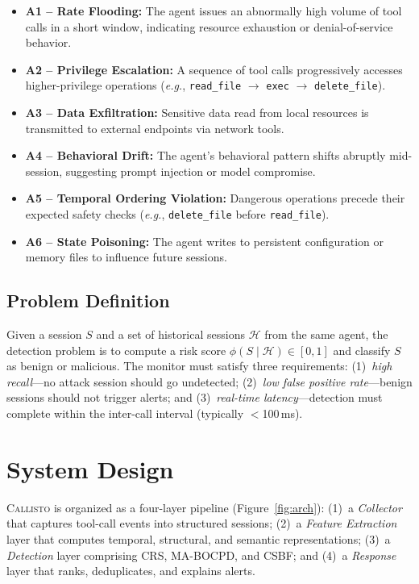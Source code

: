 \documentclass[conference,compsoc]{IEEEtran}
\newcommand{\system}{\textsc{Callisto}}
\newcommand{\eg}{\textit{e.g.}}
\begin{document}
\begin{itemize}[leftmargin=*,nosep]
\item \textbf{A1 -- Rate Flooding:} The agent issues an abnormally high volume of tool calls in a short window, indicating resource exhaustion or denial-of-service behavior.
\item \textbf{A2 -- Privilege Escalation:} A sequence of tool calls progressively accesses higher-privilege operations (\eg, \texttt{read\_file} $\to$ \texttt{exec} $\to$ \texttt{delete\_file}).
\item \textbf{A3 -- Data Exfiltration:} Sensitive data read from local resources is transmitted to external endpoints via network tools.
\item \textbf{A4 -- Behavioral Drift:} The agent's behavioral pattern shifts abruptly mid-session, suggesting prompt injection or model compromise.
\item \textbf{A5 -- Temporal Ordering Violation:} Dangerous operations precede their expected safety checks (\eg, \texttt{delete\_file} before \texttt{read\_file}).
\item \textbf{A6 -- State Poisoning:} The agent writes to persistent configuration or memory files to influence future sessions.
\end{itemize}

\subsection{Problem Definition}

Given a session $S$ and a set of historical sessions $\mathcal{H}$ from the same agent, the detection problem is to compute a risk score $\phi(S \mid \mathcal{H}) \in [0, 1]$ and classify $S$ as benign or malicious. The monitor must satisfy three requirements: (1)~\emph{high recall}---no attack session should go undetected; (2)~\emph{low false positive rate}---benign sessions should not trigger alerts; and (3)~\emph{real-time latency}---detection must complete within the inter-call interval (typically $<$100\,ms).

\section{System Design}
\label{sec:design}

\system{} is organized as a four-layer pipeline (Figure~\ref{fig:arch}): (1)~a \emph{Collector} that captures tool-call events into structured sessions; (2)~a \emph{Feature Extraction} layer that computes temporal, structural, and semantic representations; (3)~a \emph{Detection} layer comprising CRS, MA-BOCPD, and CSBF; and (4)~a \emph{Response} layer that ranks, deduplicates, and explains alerts.
\end{document}
